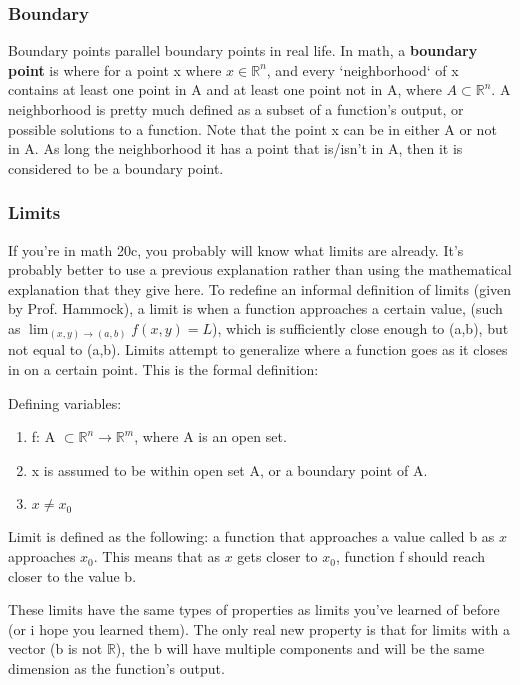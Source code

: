 \documentclass{article}
\begin{document}
\subsubsection{Boundary}
Boundary points parallel boundary points in real life. In math, a \textbf{boundary point}
is where for a point x where $x \in \mathbb{R}^n$, and every `neighborhood` of x
contains at least one point in A and at least one point not in A, where $A \subset \mathbb{R}^n$.
A neighborhood is pretty much defined as a subset of a function's output, or possible solutions to a function.
Note that the point x can be in either A or not in A. As long the neighborhood
it has a point that is/isn't in A, then it is considered to be a boundary point.
\subsubsection{Limits}
If you're in math 20c, you probably will know what limits are already.
It's probably better to use a previous explanation rather than using the mathematical explanation
that they give here. To redefine an informal definition of limits (given by Prof. Hammock),
a limit is when a function approaches a certain value, (such as $\lim_{(x,y)\rightarrow(a,b)} f(x,y) = L$),
which is sufficiently close enough to (a,b), but not equal to (a,b).\newline
Limits attempt to generalize where a function goes as it closes in on a certain point.\newpage
This is the formal definition:\newline

Defining variables:
\begin{enumerate}
    \item f: A $\subset \mathbb{R}^n \rightarrow \mathbb{R}^m$, where A is an open set.
    \item x is assumed to be within open set A, or a boundary point of A.
    \item $x \neq x_0$ 
\end{enumerate}

Limit is defined as the following: 
a function that approaches a value called b as $x$ approaches $x_0$. This means that
as $x$ gets closer to $x_0$, function f should reach closer to the value b.\newline

These limits have the same types of properties as limits you've learned of before (or i hope you learned them).
The only real new property is that for limits with a vector (b is not $\mathbb{R}$), the b will have multiple
components and will be the same dimension as the function's output.\newline
\end{document}

